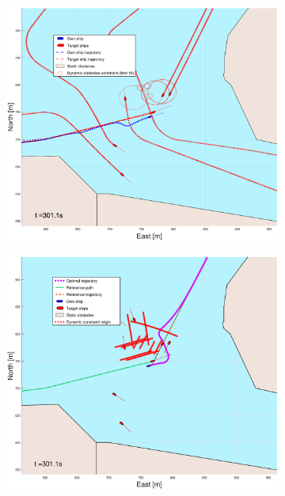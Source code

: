 \begin{figure}[ht]\ContinuedFloat
    \begin{subfigure}[b]{0.49\textwidth}
        \centering
        \includegraphics[width=\textwidth]{Images/Figures/Trheimfjord/_Simple_0fig1_time=301}
    \end{subfigure}
    \hfill
    \begin{subfigure}[b]{0.499\textwidth}
        \centering
        \includegraphics[width=\textwidth]{Images/Figures/Trheimfjord/_Simple_0fig999_time=301}

\end{subfigure}
\end{figure}

